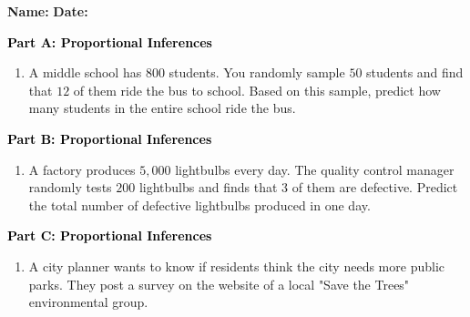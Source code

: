 \documentclass[12pt, letterpaper, fleqn]{article}
\begin{document}
\textbf{Name:} \underline{\hspace{5cm}}
\hfill
\textbf{Date:} \underline{\hspace{3cm}}\\

\begin{tcolorbox}[colback=customteal!20]
\large\textcolor{black}{\textbf{Part A: Proportional Inferences}}
\end{tcolorbox}

\vspace{3mm}

\begin{enumerate}[itemsep=2.5cm, leftmargin=0.6cm]
\item A middle school has $800$ students. You randomly sample $50$ students and find that $12$ of them ride the bus to school. Based on this sample, predict how many students in the entire school ride the bus.
\end{enumerate}

\newpage

\begin{tcolorbox}[colback=customteal!20]
\large\textcolor{black}{\textbf{Part B: Proportional Inferences}}
\end{tcolorbox}

\vspace{3mm}

\begin{enumerate}[itemsep=2.5cm, leftmargin=0.6cm, resume]
\item A factory produces $5,000$ lightbulbs every day. The quality control manager randomly tests $200$ lightbulbs and finds that $3$ of them are defective. Predict the total number of defective lightbulbs produced in one day.
\end{enumerate}

\newpage

\begin{tcolorbox}[colback=customteal!20]
\large\textcolor{black}{\textbf{Part C: Proportional Inferences}}
\end{tcolorbox}

\vspace{3mm}

\begin{enumerate}[itemsep=2.5cm, leftmargin=0.6cm, resume]
\item A city planner wants to know if residents think the city needs more public parks. They post a survey on the website of a local "Save the Trees" environmental group. 
\end{enumerate}
\end{document}
